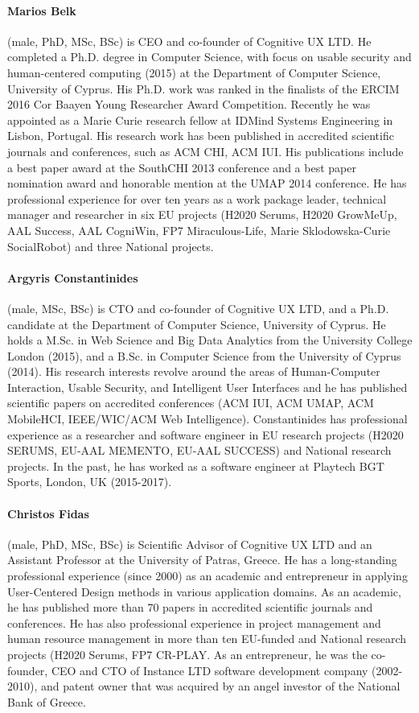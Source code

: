 \documentclass[a4paper,11pt]{article}
\begin{document}
\paragraph{Marios Belk} (male, PhD, MSc, BSc) is CEO and co-founder of Cognitive UX LTD. He completed a Ph.D. degree in Computer Science, with focus on usable security and human-centered computing (2015) at the Department of Computer Science, University of Cyprus. His Ph.D. work was ranked in the finalists of the ERCIM 2016 Cor Baayen Young Researcher Award Competition. Recently he was appointed as a Marie Curie research fellow at IDMind Systems Engineering in Lisbon, Portugal. His research work has been published in accredited scientific journals and conferences, such as ACM CHI, ACM IUI. His publications include a best paper award at the SouthCHI 2013 conference and a best paper nomination award and honorable mention at the UMAP 2014 conference. He has professional experience for over ten years as a work package leader, technical manager and researcher in six EU projects (H2020 Serums, H2020 GrowMeUp, AAL Success, AAL CogniWin, FP7 Miraculous-Life, Marie Sklodowska-Curie SocialRobot) and three National projects.

\paragraph{Argyris Constantinides} (male, MSc, BSc) is CTO and co-founder of Cognitive UX LTD, and a Ph.D. candidate at the Department of Computer Science, University of Cyprus. He holds a M.Sc. in Web Science and Big Data Analytics from the University College London (2015), and a B.Sc. in Computer Science from the University of Cyprus (2014). His research interests revolve around the areas of Human-Computer Interaction, Usable Security, and Intelligent User Interfaces and he has published scientific papers on accredited conferences (ACM IUI, ACM UMAP, ACM MobileHCI, IEEE/WIC/ACM Web Intelligence). Constantinides has professional experience as a researcher and software engineer in EU research projects (H2020 SERUMS, EU-AAL MEMENTO, EU-AAL SUCCESS) and National research projects. In the past, he has worked as a software engineer at Playtech BGT Sports, London, UK (2015-2017).

\paragraph{Christos Fidas} (male, PhD, MSc, BSc) is Scientific Advisor of Cognitive UX LTD and an Assistant Professor at the University of Patras, Greece. He has a long-standing professional experience (since 2000) as an academic and entrepreneur in applying User-Centered Design methods in various application domains. As an academic, he has published more than 70 papers in accredited scientific journals and conferences. He has also professional experience in project management and human resource management in more than ten EU-funded and National research projects (H2020 Serums, FP7 CR-PLAY. As an entrepreneur, he was the co-founder, CEO and CTO of Instance LTD software development company (2002-2010), and patent owner that was acquired by an angel investor of the National Bank of Greece.
\end{document}
